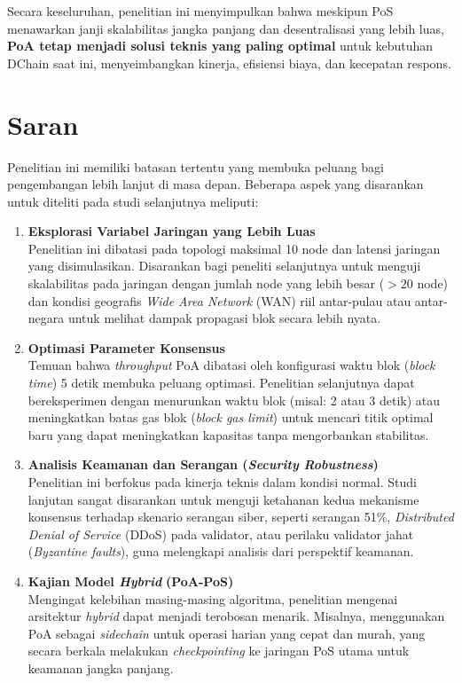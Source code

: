 Secara keseluruhan, penelitian ini menyimpulkan bahwa meskipun PoS menawarkan janji skalabilitas jangka panjang dan desentralisasi yang lebih luas, \textbf{PoA tetap menjadi solusi teknis yang paling optimal} untuk kebutuhan DChain saat ini, menyeimbangkan kinerja, efisiensi biaya, dan kecepatan respons.

\section{Saran}

Penelitian ini memiliki batasan tertentu yang membuka peluang bagi pengembangan lebih lanjut di masa depan. Beberapa aspek yang disarankan untuk diteliti pada studi selanjutnya meliputi:

\begin{enumerate}
    \item \textbf{Eksplorasi Variabel Jaringan yang Lebih Luas} \\
    Penelitian ini dibatasi pada topologi maksimal 10 node dan latensi jaringan yang disimulasikan. Disarankan bagi peneliti selanjutnya untuk menguji skalabilitas pada jaringan dengan jumlah node yang lebih besar ($>20$ node) dan kondisi geografis \textit{Wide Area Network} (WAN) riil antar-pulau atau antar-negara untuk melihat dampak propagasi blok secara lebih nyata.

    \item \textbf{Optimasi Parameter Konsensus} \\
    Temuan bahwa \textit{throughput} PoA dibatasi oleh konfigurasi waktu blok (\textit{block time}) 5 detik membuka peluang optimasi. Penelitian selanjutnya dapat bereksperimen dengan menurunkan waktu blok (misal: 2 atau 3 detik) atau meningkatkan batas gas blok (\textit{block gas limit}) untuk mencari titik optimal baru yang dapat meningkatkan kapasitas tanpa mengorbankan stabilitas.

    \item \textbf{Analisis Keamanan dan Serangan (\textit{Security Robustness})} \\
    Penelitian ini berfokus pada kinerja teknis dalam kondisi normal. Studi lanjutan sangat disarankan untuk menguji ketahanan kedua mekanisme konsensus terhadap skenario serangan siber, seperti serangan 51\%, \textit{Distributed Denial of Service} (DDoS) pada validator, atau perilaku validator jahat (\textit{Byzantine faults}), guna melengkapi analisis dari perspektif keamanan.

    \item \textbf{Kajian Model \textit{Hybrid}} \textbf{(PoA-PoS)} \\
    Mengingat kelebihan masing-masing algoritma, penelitian mengenai arsitektur \textit{hybrid} dapat menjadi terobosan menarik. Misalnya, menggunakan PoA sebagai \textit{sidechain} untuk operasi harian yang cepat dan murah, yang secara berkala melakukan \textit{checkpointing} ke jaringan PoS utama untuk keamanan jangka panjang.
\end{enumerate}

